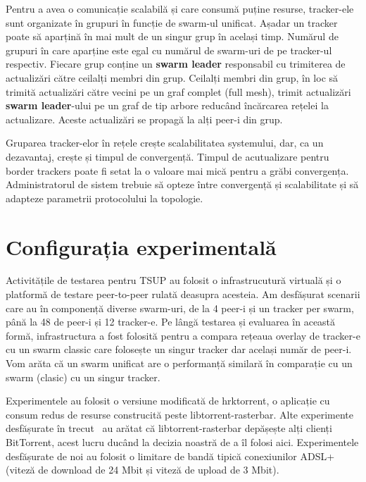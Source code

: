 Pentru a avea o comunicație scalabilă și care consumă puține resurse, tracker-ele sunt organizate în grupuri în funcție de swarm-ul unificat. Așadar un tracker poate să aparțină în mai mult de un singur grup în același timp. Numărul de grupuri în care aparține este egal cu numărul de swarm-uri de pe tracker-ul respectiv. Fiecare grup conține un \textbf{swarm leader} responsabil cu trimiterea de actualizări către ceilalți membri din grup. Ceilalți membri din grup, în loc să trimită actualizări către vecini pe un graf complet (full mesh), trimit actualizări \textbf{swarm leader}-ului pe un graf de tip arbore reducând încărcarea rețelei la actualizare. Aceste actualizări se propagă la alți peer-i din grup.

Gruparea tracker-elor în rețele crește scalabilitatea systemului, dar, ca un dezavantaj, crește și timpul de convergență. Timpul de acutualizare pentru border trackers poate fi setat la o valoare mai mică pentru a grăbi convergența. Administratorul de sistem trebuie să opteze între convergență și scalabilitate și să adapteze parametrii protocolului la topologie.

\section{Configurația experimentală}
\label{sec:unified-tracker:setup}

Activitățile de testarea pentru TSUP au folosit o infrastrucutură virtuală și o platformă de testare peer-to-peer rulată deasupra acesteia. Am desfășurat scenarii care au în componență diverse swarm-uri, de la 4 peer-i și un tracker per swarm, până la 48 de peer-i și 12 tracker-e. Pe lângă testarea și evaluarea în această formă, infrastructura a fost folosită pentru a compara rețeaua overlay de tracker-e cu un swarm classic care folosește un singur tracker dar același număr de peer-i. Vom arăta că un swarm unificat are o performanță similară în comparație cu un swarm (clasic) cu un singur tracker.

Experimentele au folosit o versiune modificată de hrktorrent, o aplicație cu consum redus de resurse construcită peste libtorrent-rasterbar. Alte experimente desfășurate în trecut~\cite{bt-vi} au arătat că libtorrent-rasterbar depășește alți clienți BitTorrent, acest lucru ducând la decizia noastră de a îl folosi aici. Experimentele desfășurate de noi au folosit o limitare de bandă tipică conexiunilor ADSL+ (viteză de download de 24 Mbit și viteză de upload de 3 Mbit).


